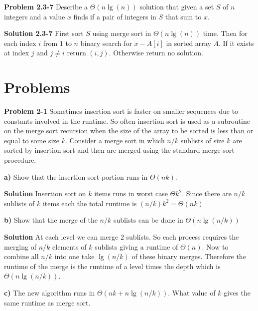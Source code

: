 \documentclass{article}
\begin{document}
\hrulefill

\medskip

\textbf{Problem 2.3-7} Describe a $\Theta(n\lg(n))$ solution that given a set $S$ of $n$ integers and a value $x$ finds if a pair of integers in $S$ that sum to $x$.

\medskip

\textbf{Solution 2.3-7} First sort $S$ using merge sort in $\Theta(n\lg(n))$ time. Then for each index $i$ from $1$ to $n$ binary search for $x - A[i]$ in sorted array $A$. If it exists at index $j$ and $j \neq i$ return $(i,j)$. Otherwise return no solution.

\hrulefill

\section*{Problems}

\hrulefill

\medskip

\textbf{Problem 2-1} Sometimes insertion sort is faster on smaller sequences due to constants involved in the runtime. So often insertion sort is used as a subroutine on the merge sort recursion when the size of the array to be sorted is less than or equal to some size $k$. Consider a merge sort in which $n/k$ sublists of size $k$ are sorted by insertion sort and then are merged using the standard merge sort procedure.

\textbf{a)} Show that the insertion sort portion runs in $\Theta(nk)$.

\medskip

\textbf{Solution} Insertion sort on $k$ items runs in worst case $\Theta{k^2}$. Since there are $n/k$ sublists of $k$ items each the total runtime is $(n/k)k^2 = \boxed{\Theta(nk)}$

\medskip

\textbf{b)} Show that the merge of the $n/k$ sublists can be done in $\Theta(n\lg(n/k))$

\medskip

\textbf{Solution} At each level we can merge 2 sublists. So each process requires the merging of $n/k$ elements of $k$ sublists giving a runtime of $\Theta(n)$. Now to combine all $n/k$ into one take $\lg(n/k)$ of these binary merges. Therefore the runtime of the merge is the runtime of a level times the depth which is $\Theta(n\lg(n/k))$.

\medskip

\textbf{c)} The new algorithm runs in $\Theta(nk + n\lg(n/k))$. What value of $k$ gives the same runtime as merge sort.
\end{document}
